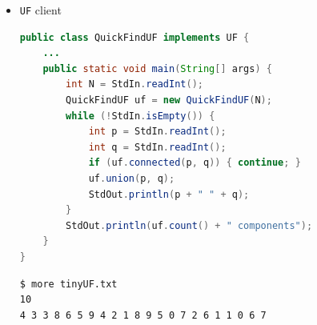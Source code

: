 \documentclass[8pt,a4paper,compress]{beamer}
\begin{document}
\begin{frame}[fragile]
\begin{minipage}{250pt}
\begin{itemize}
\item \lstinline{UF} client
\begin{lstlisting}[language=Java]
public class QuickFindUF implements UF {
    ...
    public static void main(String[] args) {
        int N = StdIn.readInt();
        QuickFindUF uf = new QuickFindUF(N);
        while (!StdIn.isEmpty()) {
            int p = StdIn.readInt();
            int q = StdIn.readInt();
            if (uf.connected(p, q)) { continue; }
            uf.union(p, q);
            StdOut.println(p + " " + q);
        }
        StdOut.println(uf.count() + " components");
    }
}
\end{lstlisting}
    
\begin{lstlisting}[language={}]
$ more tinyUF.txt
10
4 3 3 8 6 5 9 4 2 1 8 9 5 0 7 2 6 1 1 0 6 7
\end{lstlisting}    


\end{itemize}
\end{minipage}
\end{frame}
\end{document}
